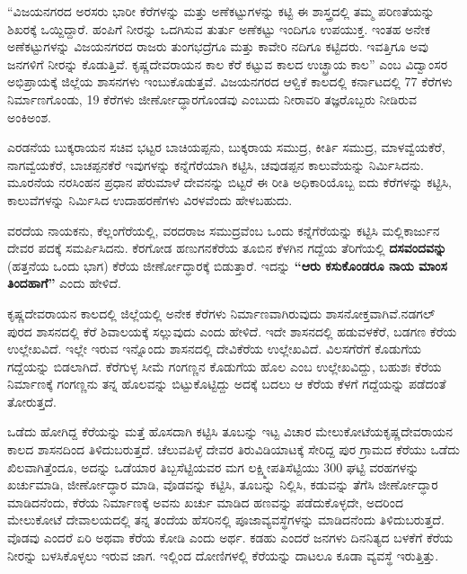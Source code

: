 “ವಿಜಯನಗರದ ಅರಸರು ಭಾರೀ ಕೆರೆಗಳನ್ನು ಮತ್ತು ಅಣೆಕಟ್ಟುಗಳನ್ನು ಕಟ್ಟಿ ಈ ಶಾಸ್ತ್ರದಲ್ಲಿ ತಮ್ಮ ಪರಿಣತೆಯನ್ನು ಶಿಖರಕ್ಕೆ ಒಯ್ದಿದ್ದಾರೆ. ಹಂಪಿಗೆ ನೀರನ್ನು ಒದಗಿಸುವ ತುರ್ತು ಅಣೆಕಟ್ಟು ಇಂದಿಗೂ ಉಪಯುಕ್ತ. ಇಂತಹ ಅನೇಕ ಅಣೆಕಟ್ಟುಗಳನ್ನು ವಿಜಯನಗರದ ರಾಜರು ತುಂಗಭದ್ರೆಗೂ ಮತ್ತು ಕಾವೇರಿ ನದಿಗೂ ಕಟ್ಟಿದರು. ಇವತ್ತಿಗೂ ಅವು ಜನಗಳಿಗೆ ನೀರನ್ನು ಕೊಡುತ್ತಿವೆ. ಕೃಷ್ಣದೇವರಾಯನ ಕಾಲ ಕೆರೆ ಕಟ್ಟುವ ಕಾಲದ ಉಚ್ಛ್ರಾಯ ಕಾಲ” ಎಂಬ ವಿದ್ವಾಂಸರ ಅಭಿಪ್ರಾಯಕ್ಕೆ ಜಿಲ್ಲೆಯ ಶಾಸನಗಳು ಇಂಬುಕೊಡುತ್ತವೆ. ವಿಜಯನಗರದ ಆಳ್ವಿಕೆ ಕಾಲದಲ್ಲಿ ಕರ್ನಾಟದಲ್ಲಿ 77 ಕೆರೆಗಳು ನಿರ್ಮಾಣಗೊಂಡು, 19 ಕೆರೆಗಳು ಜೀರ್ಣೋದ್ಧಾರಗೊಂಡವು ಎಂಬುದು ನೀರಾವರಿ ತಜ್ಞರೊಬ್ಬರು ನೀಡಿರುವ ಅಂಕಿಅಂಶ.

ಎರಡನೆಯ ಬುಕ್ಕರಾಯನ ಸಚಿವ ಭಟ್ಟರ ಬಾಚಿಯಪ್ಪನು, ಬುಕ್ಕರಾಯ ಸಮುದ್ರ, ಕೀರ್ತಿ ಸಮುದ್ರ, ಮಾಳವ್ವೆಯಕೆರೆ, ನಾಗವ್ವೆಯಕೆರೆ, ಬಾಚಪ್ಪನಕೆರೆ ಇವುಗಳನ್ನು ಕನ್ನೆಗೆರೆಯಾಗಿ ಕಟ್ಟಿಸಿ, ಚವುಡಪ್ಪನ ಕಾಲುವೆಯನ್ನು ನಿರ್ಮಿಸಿದನು. ಮೂರನೆಯ ನರಸಿಂಹನ ಪ್ರಧಾನ ಪೆರುಮಾಳೆ ದೇವನನ್ನು ಬಿಟ್ಟರೆ ಈ ರೀತಿ ಅಧಿಕಾರಿಯೊಬ್ಬ ಐದು ಕೆರೆಗಳನ್ನು ಕಟ್ಟಿಸಿ, ಕಾಲುವೆಗಳನ್ನು ನಿರ್ಮಿಸಿದ ಉದಾಹರಣೆಗಳು ವಿರಳವೆಂದು ಹೇಳಬಹುದು.

ವರದೆಯ ನಾಯಕನು, ಕೆಲ್ಲಂಗೆರೆಯಲ್ಲಿ, ವರದರಾಜ ಸಮುದ್ರವೆಂಬ ಒಂದು ಕನ್ನೆಗೆರೆಯನ್ನು ಕಟ್ಟಿಸಿ ಮಲ್ಲಿಕಾರ್ಜುನ ದೇವರ ಪದಕ್ಕೆ ಸಮರ್ಪಿಸಿದನು. ಕೆರಗೋಡ ಹಣುಗನಕೆರೆಯ ತೂಬಿನ ಕೆಳಗಿನ ಗದ್ದೆಯ ತೆರಿಗೆಯಲ್ಲಿ \textbf{ದಸವಂದವನ್ನು} (ಹತ್ತನೆಯ ಒಂದು ಭಾಗ) ಕೆರೆಯ ಜೀರ್ಣೋದ್ಧಾರಕ್ಕೆ ಬಿಡುತ್ತಾರೆ. ಇದನ್ನು \textbf{“ಆರು ಕಸುಕೊಂಡರೂ ನಾಯ ಮಾಂಸ ತಿಂದಹಾಗೆ” }ಎಂದು ಹೇಳಿದೆ.

\newpage

ಕೃಷ್ಣದೇವರಾಯನ ಕಾಲದಲ್ಲಿ ಜಿಲ್ಲೆಯಲ್ಲಿ ಅನೇಕ ಕೆರೆಗಳು ನಿರ್ಮಾಣವಾಗಿರುವುದು ಶಾಸನೋಕ್ತವಾಗಿವೆ.\break ನಡಗಲ್​ಪುರದ ಶಾಸನದಲ್ಲಿ ಕೆರೆ ಶಿವಾಲಯಕ್ಕೆ ಸಲ್ಲುವುದು ಎಂದು ಹೇಳಿದೆ. ಇದೇ ಶಾಸನದಲ್ಲಿ ಹಡುವಳಕೆರೆ, ಬಡಗಣ ಕೆರೆಯ ಉಲ್ಲೇಖವಿದೆ. ಇಲ್ಲೇ ಇರುವ ಇನ್ನೊಂದು ಶಾಸನದಲ್ಲಿ ದೇವಿಕೆರೆಯ ಉಲ್ಲೇಖವಿದೆ. ವಿಲಸಗೆರೆಗೆ ಕೊಡುಗೆಯ ಗದ್ದೆಯನ್ನು ಬಿಡಲಾಗಿದೆ. ಕೆರೆಗುಳ್ಳ ಸೀಮೆ ಗಂಗಣ್ಣನ ಕೊಡುಗೆಯ ಹೊಲ ಎಂಬ ಉಲ್ಲೇಖವಿದ್ದು, ಬಹುಶಃ ಕೆರೆಯ ನಿರ್ಮಾಣಕ್ಕೆ ಗಂಗಣ್ಣನು ತನ್ನ ಹೊಲವನ್ನು ಬಿಟ್ಟುಕೊಟ್ಟಿದ್ದು ಅದಕ್ಕೆ ಬದಲು ಆ ಕೆರೆಯ ಕೆಳಗೆ ಗದ್ದೆಯನ್ನು ಪಡೆದಂತೆ ತೋರುತ್ತದೆ.

ಒಡೆದು ಹೋಗಿದ್ದ ಕೆರೆಯನ್ನು ಮತ್ತೆ ಹೊಸದಾಗಿ ಕಟ್ಟಿಸಿ ತೂಬನ್ನು ಇಟ್ಟ ವಿಚಾರ ಮೇಲುಕೋಟೆಯ\break ಕೃಷ್ಣದೇವರಾಯನ ಕಾಲದ ಶಾಸನದಿಂದ ತಿಳಿದುಬರುತ್ತದೆ. ಚೆಲುವಪಿಳ್ಳೆ ದೇವರ ತಿರುವಿಡಿಯಾಟಕ್ಕೆ ಸೇರಿದ್ದ ಪುರ ಗ್ರಾಮದ ಕೆರೆಯು ಒಡೆದು ಖಿಲವಾಗಿತ್ತೆಂದೂ, ಅದನ್ನು ಒಡೆಯಾರ ತಿಬ್ಬಸೆಟ್ಟಿಯವರ ಮಗ ಲಕ್ಷ್ಮೀಪತಿಸೆಟ್ಟಿಯು 300 ಘಟ್ಟಿ ವರಹಗಳನ್ನು ಖರ್ಚುಮಾಡಿ, ಜೀರ್ಣೋದ್ಧಾರ ಮಾಡಿ, ವೊಡವನ್ನು ಕಟ್ಟಿಸಿ, ತೂಬನ್ನು ನಿಲ್ಲಿಸಿ, ಕಡುವನ್ನು ತೆಗೆಸಿ ಜೀರ್ಣೋದ್ಧಾರ ಮಾಡಿದನೆಂದು, ಕೆರೆಯ ನಿರ್ಮಾಣಕ್ಕೆ ಅವನು ಖರ್ಚು ಮಾಡಿದ ಹಣವನ್ನು ಪಡೆದುಕೊಳ್ಳದೇ, ಅದರಿಂದ ಮೇಲುಕೋಟೆ ದೇವಾಲಯದಲ್ಲಿ ತನ್ನ ತಂದೆಯ ಹೆಸರಿನಲ್ಲಿ ಪೂಜಾವ್ಯವಸ್ಥೆಗಳನ್ನು ಮಾಡಿದನೆಂದು ತಿಳಿದುಬರುತ್ತದೆ. ವೊಡವು ಎಂದರೆ ಏರಿ ಅಥವಾ ಕೆರೆಯ ಕೋಡಿ ಎಂದು ಅರ್ಥ. ಕಡಹು ಎಂದರೆ ಜನಗಳು ದಿನನಿತ್ಯದ ಬಳಕೆಗೆ ಕೆರೆಯ ನೀರನ್ನು ಬಳಸಿಕೊಳ್ಳಲು ಇರುವ ಜಾಗ. ಇಲ್ಲಿಂದ ದೋಣಿಗಳಲ್ಲಿ ಕೆರೆಯನ್ನು ದಾಟಲೂ ಕೂಡಾ ವ್ಯವಸ್ಥೆ ಇರುತ್ತಿತ್ತು.

